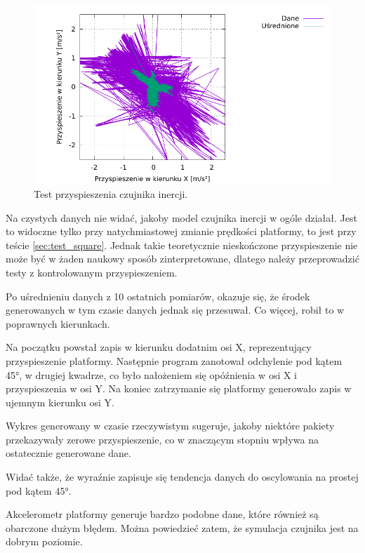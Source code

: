 		\begin{figure}[H]
		\centering
			\includegraphics[width=\textwidth]{plots/wewucho_linear.pdf}
			\caption{Test przyspieszenia czujnika inercji.}
			\label{plot:wewucho_angular}
		\end{figure}
		
		Na czystych danych nie widać, jakoby model czujnika inercji w ogóle działał. 
		Jest to widoczne tylko przy natychmiastowej zmianie prędkości platformy, to jest przy teście \ref{sec:test_square}.
		Jednak takie teoretycznie nieskończone przyspieszenie nie może być w żaden naukowy sposób zinterpretowane, dlatego należy przeprowadzić testy z kontrolowanym
		przyspieszeniem.
		
		Po uśrednieniu danych z 10 ostatnich pomiarów, okazuje się, że środek generowanych w tym czasie danych jednak się przesuwał.
		Co więcej, robił to w poprawnych kierunkach.
		
		Na początku powstał zapis w kierunku dodatnim osi X, reprezentujący przyspieszenie platformy.
		Następnie program zanotował odchylenie pod kątem 45°, w drugiej kwadrze, co było nałożeniem się opóźnienia w osi X i przyspieszenia w osi Y.
		Na koniec zatrzymanie się platformy generowało zapis w ujemnym kierunku osi Y.
		
		Wykres generowany w czasie rzeczywistym sugeruje, jakoby niektóre pakiety przekazywały zerowe przyspieszenie, co w znaczącym stopniu wpływa na 
		ostatecznie generowane dane.
		
		Widać także, że wyraźnie zapisuje się tendencja danych do oscylowania na prostej pod kątem 45°.
		
		Akcelerometr platformy generuje bardzo podobne dane, które również są obarczone dużym błędem.
		Można powiedzieć zatem, że symulacja czujnika jest na dobrym poziomie.
		
		
		
		
		
	
	
